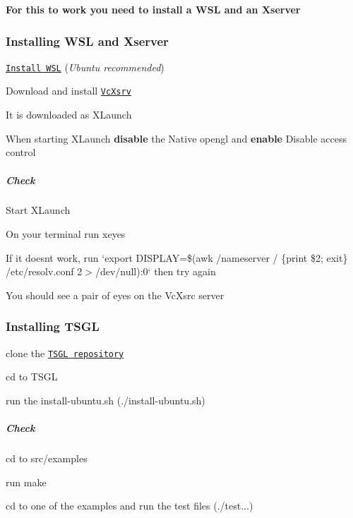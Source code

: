 {\bfseries For this to work you need to install a W\+SL and an Xserver}

\subsubsection*{Installing W\+SL and Xserver}


\begin{DoxyEnumerate}
\item \href{https://docs.microsoft.com/en-us/windows/wsl/install-win10}{\tt Install W\+SL} ({\itshape Ubuntu recommended})
\item Download and install \href{https://sourceforge.net/projects/vcxsrv/}{\tt Vc\+Xsrv}
\begin{DoxyItemize}
\item It is downloaded as {\ttfamily X\+Launch}
\item When starting X\+Launch {\bfseries disable} the {\ttfamily Native opengl} and {\bfseries enable} {\ttfamily Disable access control}
\end{DoxyItemize}
\end{DoxyEnumerate}



\subparagraph*{Check}


\begin{DoxyItemize}
\item Start X\+Launch
\item On your terminal run {\ttfamily xeyes}
\begin{DoxyItemize}
\item If it doesn\textquotesingle{}t work, run `export D\+I\+S\+P\+L\+AY=\$(awk \textquotesingle{}/nameserver / \{print \$2; exit\}\textquotesingle{} /etc/resolv.conf 2$>$/dev/null)\+:0` then try again
\end{DoxyItemize}
\item You should see a pair of eyes on the Vc\+Xsrc server
\end{DoxyItemize}

\subsubsection*{Installing T\+S\+GL}


\begin{DoxyEnumerate}
\item clone the \href{https://github.com/samuelth47/TSGL/blob/fix-cygwin-ubuntu/NewWindows/xlaunch.gif}{\tt T\+S\+GL repository}
\item cd to T\+S\+GL
\item run the install-\/ubuntu.\+sh ({\ttfamily ./install-\/ubuntu.sh})
\end{DoxyEnumerate}

\subparagraph*{Check}


\begin{DoxyItemize}
\item cd to src/examples
\item run {\ttfamily make}
\item cd to one of the examples and run the test files ({\ttfamily ./test...}) 
\end{DoxyItemize}
